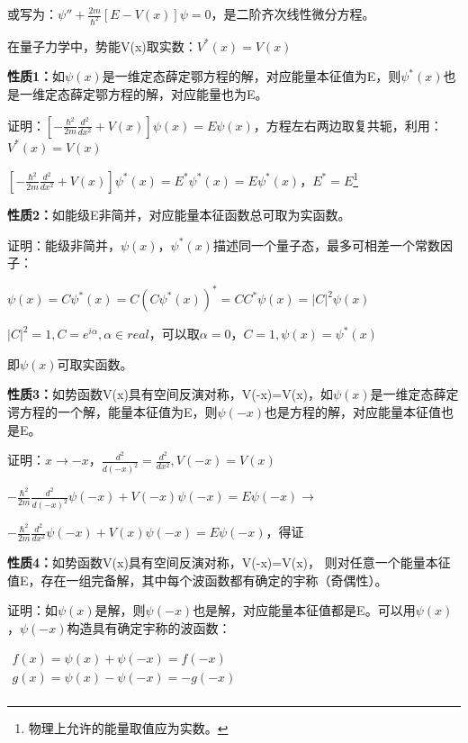 或写为：$\psi '' + \frac{{2m}}{{\hbar ^2 }}\left[ {E - V(x)} \right]\psi  = 0$，是二阶齐次线性微分方程。

在量子力学中，势能V(x)取实数：$V^* (x) = V(x)$

\textbf{性质1：}如$\psi (x)$是一维定态薛定鄂方程的解，对应能量本征值为E，则$\psi ^* (x)$也是一维定态薛定鄂方程的解，对应能量也为E。

证明：$\left[ { - \frac{{\hbar ^2 }}{{2m}}\frac{{d^2 }}{{dx^2 }} + V(x)} \right]\psi (x) = E\psi (x)$，方程左右两边取复共轭，利用：$V^* (x) = V(x)$

$\left[ { - \frac{{\hbar ^2 }}{{2m}}\frac{{d^2 }}{{dx^2 }} + V(x)} \right]\psi ^* (x) = E^* \psi ^* (x) = E\psi ^* (x)$，$E^*  = E$\footnote{物理上允许的能量取值应为实数。}

\textbf{性质2：}如能级E非简并，对应能量本征函数总可取为实函数。

证明：能级非简并，$\psi (x)$，$\psi ^* (x)$描述同一个量子态，最多可相差一个常数因子：

\begin{center}
$\psi (x) = C\psi ^* (x) = C\left( {C\psi ^* (x)} \right)^*  = CC^* \psi (x) = \left| C \right|^2 \psi (x)$
\end{center}

$\left| C \right|^2  = 1,C = e^{i\alpha } ,\alpha  \in real$，可以取$\alpha  = 0$，$C = 1,\psi (x) = \psi ^* (x)$

即$\psi (x)$可取实函数。

\textbf{性质3：}如势函数V(x)具有空间反演对称，V(-x)=V(x)，如$\psi (x)$是一维定态薛定谔方程的一个解，能量本征值为E，则$\psi ( - x)$也是方程的解，对应能量本征值也是E。

证明：$x \to  - x$，$\frac{{d^2 }}{{d( - x)^2 }} = \frac{{d^2 }}{{dx^2 }},V( - x) = V(x)$

$ - \frac{{\hbar ^2 }}{{2m}}\frac{{d^2 }}{{d( - x)^2 }}\psi ( - x) + V( - x)\psi ( - x) = E\psi ( - x) \to $

$ - \frac{{\hbar ^2 }}{{2m}}\frac{{d^2 }}{{dx^2 }}\psi ( - x) + V(x)\psi ( - x) = E\psi ( - x)$，得证

\textbf{性质4：}如势函数V(x)具有空间反演对称，V(-x)=V(x)，
则对任意一个能量本征值E，存在一组完备解，其中每个波函数都有确定的宇称（奇偶性）。

证明：如$\psi (x)$是解，则$\psi ( - x)$也是解，对应能量本征值都是E。可以用$\psi (x)$，$\psi ( - x)$构造具有确定宇称的波函数：

\begin{center}
$\begin{array}{l}
 f(x) = \psi (x) + \psi ( - x) = f( - x) \\
 g(x) = \psi (x) - \psi ( - x) =  - g( - x) \\
 \end{array}$
\end{center}

